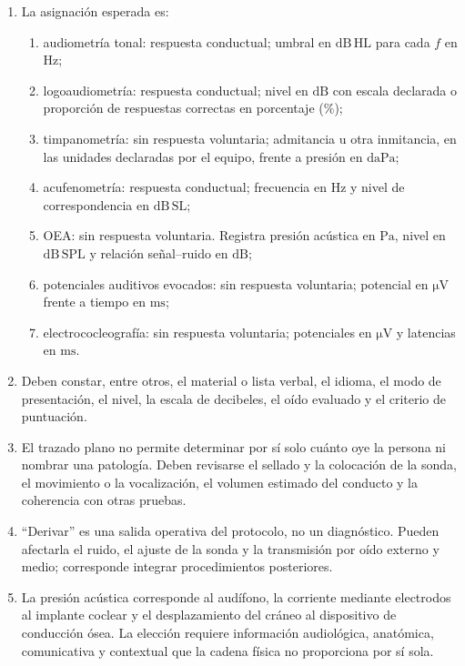 \begin{enumerate}[label=\textbf{A\arabic*.},leftmargin=*]
    \item La asignación esperada es:
    \begin{enumerate}
        \item audiometría tonal: respuesta conductual; umbral en
        \(\mathrm{dB\,HL}\) para cada \(f\) en \(\mathrm{Hz}\);
        \item logoaudiometría: respuesta conductual; nivel en
        \(\mathrm{dB}\) con escala declarada o proporción de respuestas
        correctas en porcentaje (\(\%\));
        \item timpanometría: sin respuesta voluntaria; admitancia u otra
        inmitancia, en las unidades declaradas por el equipo, frente a presión
        en \(\mathrm{daPa}\);
        \item acufenometría: respuesta conductual; frecuencia en
        \(\mathrm{Hz}\) y nivel de correspondencia en \(\mathrm{dB\,SL}\);
        \item OEA: sin respuesta voluntaria. Registra presión acústica en
        \(\mathrm{Pa}\), nivel en \(\mathrm{dB\,SPL}\) y relación señal--ruido
        en \(\mathrm{dB}\);
        \item potenciales auditivos evocados: sin respuesta voluntaria;
        potencial en \(\mathrm{\mu V}\) frente a tiempo en \(\mathrm{ms}\);
        \item electrococleografía: sin respuesta voluntaria; potenciales en
        \(\mathrm{\mu V}\) y latencias en \(\mathrm{ms}\).
    \end{enumerate}

    \item Deben constar, entre otros, el material o lista verbal, el idioma, el
    modo de presentación, el nivel, la escala de decibeles, el oído evaluado y
    el criterio de puntuación.

    \item El trazado plano no permite determinar por sí solo cuánto oye la
    persona ni nombrar una patología. Deben revisarse el sellado y la
    colocación de la sonda, el movimiento o la vocalización, el volumen
    estimado del conducto y la coherencia con otras pruebas.

    \item ``Derivar'' es una salida operativa del protocolo, no un diagnóstico.
    Pueden afectarla el ruido, el ajuste de la sonda y la transmisión por oído
    externo y medio; corresponde integrar procedimientos posteriores.

    \item La presión acústica corresponde al audífono, la corriente mediante
    electrodos al implante coclear y el desplazamiento del cráneo al
    dispositivo de conducción ósea. La elección requiere información
    audiológica, anatómica, comunicativa y contextual que la cadena física no
    proporciona por sí sola.
\end{enumerate}


